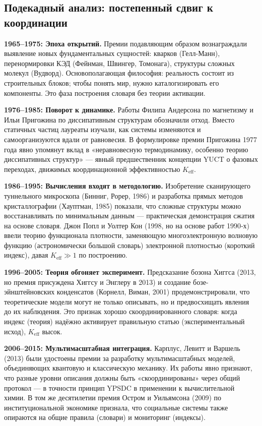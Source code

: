 \documentclass[12pt,a4paper]{article}
\begin{document}
	\subsection{Подекадный анализ: постепенный сдвиг к координации}
	
	\textbf{1965–1975: Эпоха открытий.} Премии подавляющим образом вознаграждали выявление новых фундаментальных сущностей: кварков (Гелл-Манн), перенормировки КЭД (Фейнман, Швингер, Томонага), структуры сложных молекул (Вудворд). Основополагающая философия: реальность состоит из строительных блоков; чтобы понять мир, нужно каталогизировать его компоненты. Это фаза построения словаря без теории активации.
	
	\textbf{1976–1985: Поворот к динамике.} Работы Филипа Андерсона по магнетизму и Ильи Пригожина по диссипативным структурам обозначили отход. Вместо статичных частиц лауреаты изучали, как системы изменяются и самоорганизуются вдали от равновесия. В формулировке премии Пригожина 1977 года явно упомянут вклад в «неравновесную термодинамику, особенно теорию диссипативных структур» — явный предшественник концепции YUCT о фазовых переходах, движимых координационной эффективностью \(K_{\mathrm{eff}}\).
	
	\textbf{1986–1995: Вычисления входят в методологию.} Изобретение сканирующего туннельного микроскопа (Бинниг, Рорер, 1986) и разработка прямых методов кристаллографии (Хауптман, 1985) показали, что сложные структуры можно восстанавливать по минимальным данным — практическая демонстрация сжатия на основе словаря. Джон Попл и Уолтер Кон (1998, но на основе работ 1990‑х) ввели теорию функционала плотности, заменяющую многоэлектронную волновую функцию (астрономически большой словарь) электронной плотностью (короткий индекс), давая \(K_{\mathrm{eff}} \gg 1\) по построению.
	
	\textbf{1996–2005: Теория обгоняет эксперимент.} Предсказание бозона Хиггса (2013, но премия присуждена Хиггсу и Энглеру в 2013) и создание бозе-эйнштейновских конденсатов (Корнелл, Виман, 2001) продемонстрировали, что теоретические модели могут не только описывать, но и предвосхищать явления до их наблюдения. Это признак хорошо скоординированного словаря: когда индекс (теория) надёжно активирует правильную статью (экспериментальный исход), \(K_{\mathrm{eff}}\) высок.
	
	\textbf{2006–2015: Мультимасштабная интеграция.} Карплус, Левитт и Варшель (2013) были удостоены премии за разработку мультимасштабных моделей, объединяющих квантовую и классическую механику. Их работы явно признают, что разные уровни описания должны быть «скоординированы» через общий протокол — в точности принцип YPSDC в применении к вычислительной химии. В том же десятилетии премия Остром и Уильямсона (2009) по институциональной экономике признала, что социальные системы также опираются на общие правила (словари) и мониторинг (индексы).
	
\end{document}
